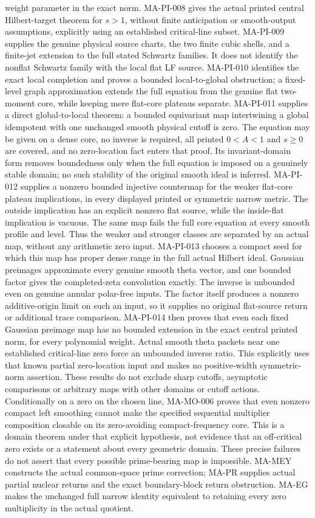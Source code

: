\documentclass[11pt,a4paper]{article}
\begin{document}
weight parameter in the exact norm. MA-PI-008 gives the actual
printed central Hilbert-target theorem for $s>1$, without
finite anticipation or smooth-output assumptions, explicitly
using an established critical-line subset. MA-PI-009 supplies
the genuine physical source charts, the two finite cubic shells,
and a finite-jet extension to the full stated Schwartz families.
It does not identify the nonflat Schwartz family with the local
flat LF source. MA-PI-010 identifies the exact local completion
and proves a bounded local-to-global obstruction; a fixed-level
graph approximation extends the full equation from the genuine
flat two-moment core, while keeping mere flat-core plateaus
separate. MA-PI-011 supplies a direct global-to-local theorem:
a bounded equivariant map intertwining a global idempotent with
one unchanged smooth physical cutoff is zero. The equation may
be given on a dense core, no inverse is required, all printed
$0<A<1$ and $s\ge0$ are covered, and no zero-location fact
enters that proof. Its invariant-domain form removes boundedness
only when the full equation is imposed on a genuinely stable
domain; no such stability of the original smooth ideal is inferred.
MA-PI-012 supplies a nonzero bounded injective countermap for
the weaker flat-core plateau implications, in every displayed
printed or symmetric narrow metric. The outside implication has
an explicit nonzero flat source, while the inside-flat implication
is vacuous. The same map fails the full core equation at every
smooth profile and level. Thus the weaker and stronger classes
are separated by an actual map, without any arithmetic zero input.
MA-PI-013 chooses a compact seed for which this map has proper
dense range in the full actual Hilbert ideal. Gaussian preimages
approximate every genuine smooth theta vector, and one bounded
factor gives the completed-zeta convolution exactly. The inverse
is unbounded even on genuine annular polar-free inputs. The
factor itself produces a nonzero additive-origin limit on such
an input, so it supplies no original flat-source return or
additional trace comparison.
MA-PI-014 then proves that even each fixed Gaussian preimage
map has no bounded extension in the exact central printed norm,
for every polynomial weight. Actual smooth theta packets near
one established critical-line zero force an unbounded inverse
ratio. This explicitly uses that known partial zero-location
input and makes no positive-width symmetric-norm assertion.
These results do not exclude sharp cutoffs, asymptotic comparisons
or arbitrary maps with other domains or cutoff actions.
Conditionally on a zero on the chosen line, MA-MO-006 proves
that even nonzero compact left smoothing cannot make the
specified sequential multiplier composition closable on its
zero-avoiding compact-frequency core. This is a domain theorem
under that explicit hypothesis, not evidence that an off-critical
zero exists or a statement about every geometric domain.
These precise failures do
not assert that every possible prime-bearing map is impossible.
MA-MEY constructs the actual common-space prime correction;
MA-PR supplies actual partial nuclear returns and the exact
boundary-block return obstruction. MA-EG makes the unchanged
full narrow identity equivalent to retaining every zero
multiplicity in the actual quotient.
\end{document}

